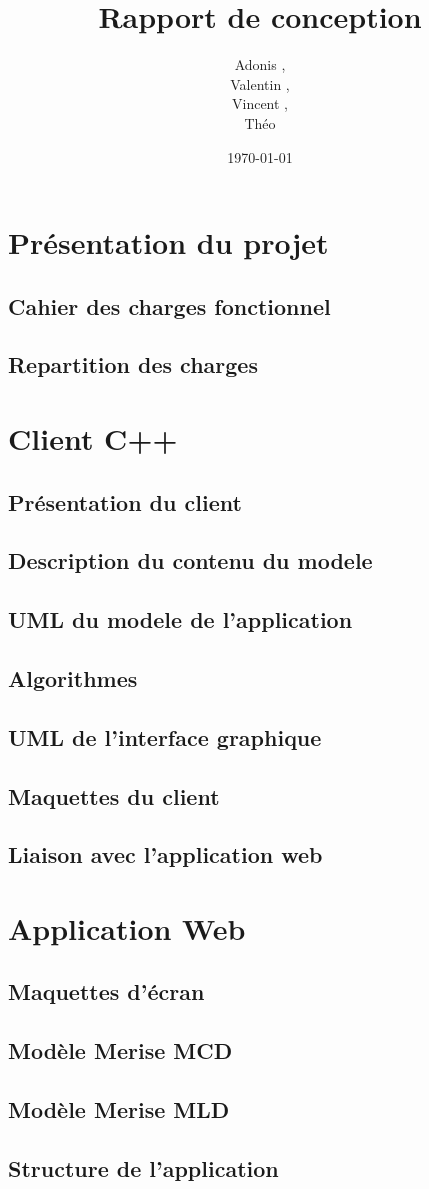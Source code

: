 \documentclass[a4paper]{article}
\title{Rapport de conception}
\author{Adonis \bsc{Najimi},\\
 Valentin \bsc{Stern},\\
 Vincent \bsc{Albert},\\
 Théo \bsc{Gerriet}}
\date{\today}
\begin{document}
\maketitle
\newpage

\section{Présentation du projet}
	\subsection{Cahier des charges fonctionnel}
		
	\subsection{Repartition des charges}
		
\section{Client C++}
	\subsection{Présentation du client}
		
	\subsection{Description du contenu du modele}
		
	\subsection{UML du modele de l'application}
		
	\subsection{Algorithmes}
		
	\subsection{UML de l'interface graphique}
		
	\subsection{Maquettes du client}
		
	\subsection{Liaison avec l'application web}
		
\section{Application Web}
	\subsection{Maquettes d'écran}
		
	\subsection{Modèle Merise MCD}
		
	\subsection{Modèle Merise MLD}
		
	\subsection{Structure de l'application}
		

\newpage
\tableofcontents
\end{document}
